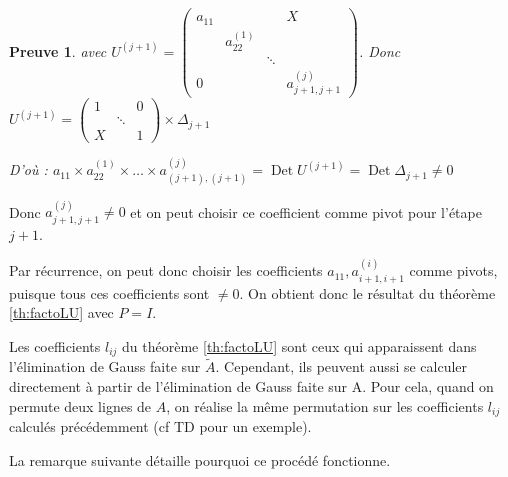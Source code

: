 \documentclass[a4paper,11pt]{article}
\DeclareMathOperator{\Det}{Det}
\theoremstyle{plain} %
\newtheorem{preuve}{Preuve}
\begin{document}
\begin{preuve}
    avec $U^{(j+1)} = 
    \begin{pmatrix} 
        a_{11} & & & X \\
        & a_{22}^{(1)} & & \\
        & & \ddots & \\
        0 & & & a_{j+1,j+1}^{(j)}
    \end{pmatrix}$.
    Donc $U^{(j+1)} = 
            \begin{pmatrix}
                1 & & 0 \\
                & \ddots & \\
                X & & 1
            \end{pmatrix}
            \times \Delta_{j+1}$
            
            D'où : $a_{11} \times a_{22}^{(1)} \times \dots \times a^{(j)}_{(j+1),(j+1)} = \Det U^{(j+1)} = \Det \Delta_{j+1} \ne 0$ 
\end{preuve}

Donc $a^{(j)}_{j+1,j+1} \ne 0$ et on peut choisir ce coefficient comme pivot pour l'étape $j+1$.

Par récurrence, on peut donc choisir les coefficients $a_{11}, a_{i+1,i+1}^{(i)}$ comme pivots, puisque tous ces coefficients sont $\ne 0$. On obtient donc le résultat du théorème \ref{th:factoLU} avec $P=I$.


\begin{remark}
    Les coefficients $l_{ij}$ du théorème \ref{th:factoLU} sont ceux qui apparaissent dans l'élimination de Gauss faite sur $\tilde{A}$. Cependant, ils peuvent aussi se calculer directement à partir de l'élimination de Gauss faite sur A. Pour cela, quand on permute deux lignes de $A$, on réalise la même permutation sur les coefficients $l_{ij}$ calculés précédemment (cf TD pour un exemple).

    La remarque suivante détaille pourquoi ce procédé fonctionne.
\end{remark}
\end{document}
